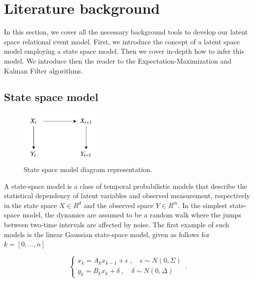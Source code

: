 \documentclass[mscthesis]{usiinfthesis}
\begin{document}
\chapter{Literature background}

In this section, we cover all the necessary background tools to develop our latent space relational event model. First, we introduce the concept of a latent space model employing a state space model. Then we cover in-depth how to infer this model. We introduce then the reader to the Expectation-Maximization and Kalman Filter algorithms. 

\section{State space model}
\label{sec:latent_space}

\begin{figure}[H]
    \centering
    \includegraphics[width=0.35\textwidth]{statespace_diagram.png}
    \caption{State space model diagram representation.}
    \label{fig:statespace_diagram}
\end{figure}

A state-space model is a class of temporal probabilistic models that describe the statistical dependency of latent variables and observed measurement, respectively in the state space $X \in R^d$ and the observed space $Y \in R^m$. In the simplest state-space model, the dynamics are assumed to be a random walk where the jumps between two-time intervals are affected by noise. The first example of such models is the linear Gaussian state-space model, given as follows for $k = [0, ..., n]$

\begin{eqfloat}
\begin{equation}
    \begin{cases}
      x_k = A_k x_{k-1} + \epsilon \; , \quad \epsilon \sim N(0, \Sigma) \\
      y_k = B_k x_k + \delta  \; , \quad \delta \sim N(0, \Delta) 
    \end{cases}\,.
\label{eq:statespace}
\end{equation}
\caption{State space model}
\end{eqfloat}
\end{document}
